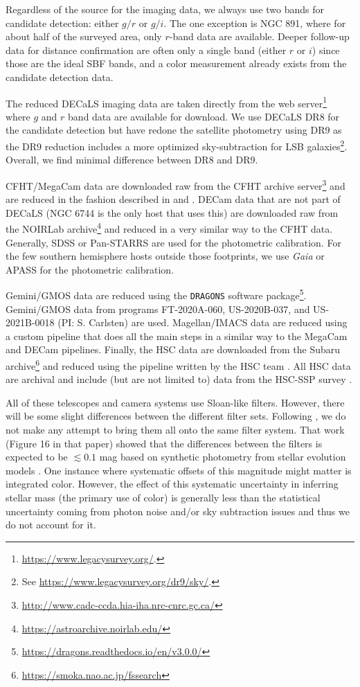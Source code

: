 \documentclass[twocolumn]{aastex62}
\begin{document}
Regardless of the source for the imaging data, we always use two bands for candidate detection: either $g/r$ or $g/i$. The one exception is NGC 891, where for about half of the surveyed area, only $r$-band data are available. Deeper follow-up data for distance confirmation are often only a single band (either $r$ or $i$) since those are the ideal SBF bands, and a color measurement already exists from the candidate detection data. 

The reduced DECaLS imaging data are taken directly from the web server\footnote{\url{https://www.legacysurvey.org/}.} where $g$ and $r$ band data are available for download. We use DECaLS DR8 for the candidate detection but have redone the satellite photometry using DR9 as the DR9 reduction includes a more optimized sky-subtraction for LSB galaxies\footnote{See \url{https://www.legacysurvey.org/dr9/sky/}.}. Overall, we find minimal difference between DR8 and DR9.

CFHT/MegaCam data are downloaded raw from the CFHT archive server\footnote{\url{http://www.cadc-ccda.hia-iha.nrc-cnrc.gc.ca/}} and are reduced in the fashion described in \citet{sbf_calib} and \citet{carlsten2020a}. DECam data that are not part of DECaLS (NGC 6744 is the only host that uses this) are downloaded raw from the NOIRLab archive\footnote{\url{https://astroarchive.noirlab.edu/}} and reduced in a very similar way to the CFHT data. Generally, SDSS \citep{sdss_df14} or Pan-STARRS \citep{panstarrs, panstarrs2} are used for the photometric calibration. For the few southern hemisphere hosts outside those footprints, we use \emph{Gaia} \citep{gaia_dr2} or APASS \citep{apass} for the photometric calibration. 

Gemini/GMOS data are reduced using the \texttt{DRAGONS} software package\footnote{\url{https://dragons.readthedocs.io/en/v3.0.0/}}. Gemini/GMOS data from programs FT-2020A-060, US-2020B-037, and US-2021B-0018 (PI: S. Carlsten) are used. Magellan/IMACS data are reduced using a custom pipeline that does all the main steps in a similar way to the MegaCam and DECam pipelines. Finally, the HSC data are downloaded from the Subaru archive\footnote{\url{https://smoka.nao.ac.jp/fssearch}} and reduced using the pipeline written by the HSC team \citep{bosch2018}. All HSC data are archival and include (but are not limited to) data from the HSC-SSP survey \citep{aihara2018, aihara2019}. 

All of these telescopes and camera systems use Sloan-like filters. However, there will be some slight differences between the different filter sets. Following \citet{carlsten2021a}, we do not make any attempt to bring them all onto the same filter system. That work (Figure 16 in that paper) showed that the differences between the filters is expected to be $\lesssim0.1$ mag based on synthetic photometry from stellar evolution models \citep{mist_models}. One instance where systematic offsets of this magnitude might matter is integrated color. However, the effect of this systematic uncertainty in inferring stellar mass (the primary use of color) is generally less than the statistical uncertainty coming from photon noise and/or sky subtraction issues and thus we do not account for it. 
\end{document}
